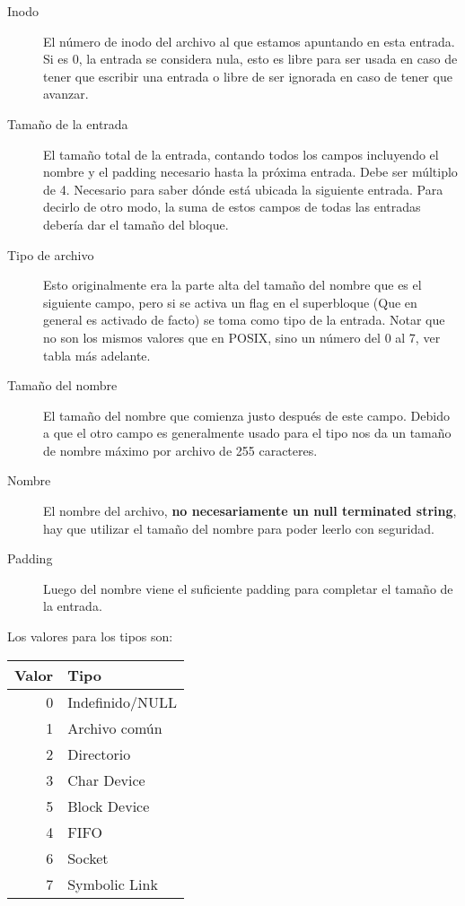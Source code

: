 \begin{description}
    \item[Inodo] El número de inodo del archivo al que estamos apuntando en esta entrada. Si es 0, la entrada se considera nula, esto es libre para ser usada en caso de tener que escribir una entrada o libre de ser ignorada en caso de tener que avanzar.
    \item[Tamaño de la entrada] El tamaño total de la entrada, contando todos los campos incluyendo el nombre y el padding necesario hasta la próxima entrada. Debe ser múltiplo de 4. Necesario para saber dónde está ubicada la siguiente entrada. Para decirlo de otro modo, la suma de estos campos de todas las entradas debería dar el tamaño del bloque.
    \item[Tipo de archivo] Esto originalmente era la parte alta del tamaño del nombre que es el siguiente campo, pero si se activa un flag en el superbloque (Que en general es activado de facto) se toma como tipo de la entrada. Notar que no son los mismos valores que en POSIX, sino un número del 0 al 7, ver tabla más adelante.
    \item[Tamaño del nombre] El tamaño del nombre que comienza justo después de este campo. Debido a que el otro campo es generalmente usado para el tipo nos da un tamaño de nombre máximo por archivo de 255 caracteres.
    \item[Nombre] El nombre del archivo, \textbf{no necesariamente un null terminated string}, hay que utilizar el tamaño del nombre para poder leerlo con seguridad.
    \item[Padding] Luego del nombre viene el suficiente padding para completar el tamaño de la entrada.
\end{description}

Los valores para los tipos son: \par

\begin{tabular}{r|l}
Valor & Tipo \\ \hline
0 & Indefinido/NULL \\ 
1 & Archivo común \\
2 & Directorio \\
3 & Char Device \\
5 & Block Device \\
4 & FIFO \\
6 & Socket \\
7 & Symbolic Link \\
\end{tabular} \\

